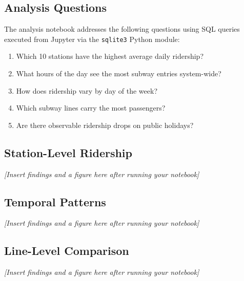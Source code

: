 
\subsection{Analysis Questions}

The analysis notebook addresses the following questions using SQL queries
executed from Jupyter via the \texttt{sqlite3} Python module:

\begin{enumerate}
    \item Which 10 stations have the highest average daily ridership?
    \item What hours of the day see the most subway entries system-wide?
    \item How does ridership vary by day of the week?
    \item Which subway lines carry the most passengers?
    \item Are there observable ridership drops on public holidays?
\end{enumerate}


\subsection{Station-Level Ridership}
\textit{[Insert findings and a figure here after running your notebook]}

\subsection{Temporal Patterns}
\textit{[Insert findings and a figure here after running your notebook]}

\subsection{Line-Level Comparison}
\textit{[Insert findings and a figure here after running your notebook]}
